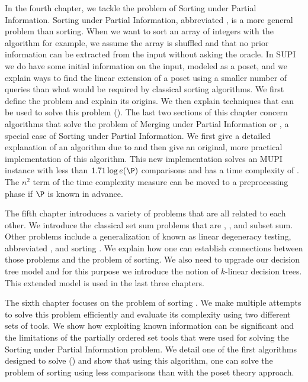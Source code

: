 In the fourth chapter, we tackle the problem of Sorting under Partial
Information. Sorting under Partial Information, abbreviated , is
a more general problem than sorting. When we want to sort an array of integers
with the \quicksort algorithm for example, we assume the array is shuffled and
that no prior information can be extracted from the input without asking the
oracle. In SUPI we do have some initial information on the input, modeled as a
poset, and we explain ways
to find the linear extension of a poset using a smaller number of queries than
what would be required by classical sorting algorithms. We first define
the problem and explain its origins. We then explain techniques that can
be used to solve this problem (\cite{kahn:1995,cardinal:2013}). The
last two sections of this chapter concern
algorithms that solve the problem of Merging under Partial Information or
, a special case of Sorting under Partial Information. We first
give a detailed explanation of an algorithm due to \citet*{linial:1984} and
then give an original, more practical implementation of this algorithm. This
new implementation solves an MUPI instance with less than \(1.71 \log e(\P)\)
comparisons and has a time complexity of . The
\(n^2\) term of the time complexity measure can be moved to a preprocessing
phase if \(\P\) is known in advance.

The fifth chapter introduces a variety of problems that are all related to
each other. We introduce the classical set sum problems that are
\threeSUM, \kSUM, and subset sum. Other problems include a generalization of
\kSUM known as linear degeneracy testing, abbreviated \kLDT, and sorting \XY.
We explain how one can establish connections between those problems and the problem
of sorting. We also need to upgrade our decision tree model and for this
purpose we introduce the notion of \(k\)-linear decision trees. This
extended model is used in the last three chapters.

The sixth chapter focuses on the problem of sorting \XY. We make
multiple attempts to solve this problem efficiently and evaluate its complexity
using two different sets of tools. We show how exploiting known information
can be significant and the limitations of the partially ordered set tools that
were used for solving the Sorting under Partial Information problem. We
detail one of the first algorithms designed to solve 
(\cite{fredman:1976}) and
show that using this algorithm, one can solve the problem of sorting \XY
using less comparisons than with the poset theory approach.

